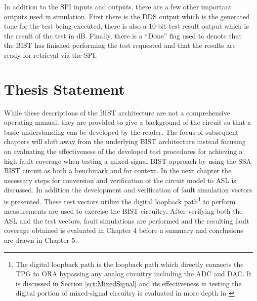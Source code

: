 \documentclass[12pt]{report}
\begin{document}
In addition to the SPI inputs and outputs, there are a few other important outputs used in simulation.  First there is the DDS output which is the generated tone for the test being executed, there is also a 10-bit test result output which is the result of the test in dB.  Finally, there is a ``Done'' flag used to denote that the BIST has finished performing the test requested and that the results are ready for retrieval via the SPI.

\section{Thesis Statement}
While these descriptions of the BIST architecture are not a comprehensive operating manual, they are provided to give a background of the circuit so that a basic understanding can be developed by the reader.  The focus of subsequent chapters will shift away from the underlying BIST architecture instead focusing on evaluating the effectiveness of the developed test procedures for achieving a high fault coverage when testing a mixed-signal BIST approach by using the SSA BIST circuit as both a benchmark and for context.  In the next chapter the necessary steps for conversion and verification of the circuit model to ASL is discussed.  In addition the development and verification of fault simulation vectors is presented.  These test vectors utilize the digital loopback path\footnote{The digital loopback path is the loopback path which directly connects the TPG to ORA bypassing any analog circuitry including the ADC and DAC.  It is discussed in Section \ref{sct:MixedSignal} and its effectiveness in testing the digital portion of mixed-signal circuitry is evaluated in more depth in \cite{stroud-analog}} to perform measurements are used to exercise the BIST circuitry.  After verifying both the ASL and the test vectors, fault simulations are performed and the resulting fault coverage obtained is evaluated in Chapter 4 before a summary and conclusions are drawn in Chapter 5. 
\end{document}
